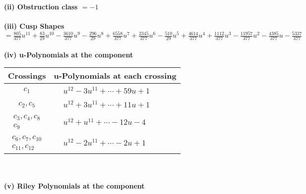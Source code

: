 \documentclass[1p]{elsarticle_modified}
\theoremstyle{definition}
\begin{document}
\flushleft \textbf{(ii) Obstruction class $= -1$}\\~\\
\flushleft \textbf{(iii) Cusp Shapes $= \frac{805}{377} u^{11}+\frac{83}{29} u^{10}-\frac{3610}{377} u^9-\frac{296}{29} u^8+\frac{6558}{377} u^7+\frac{2345}{377} u^6-\frac{510}{29} u^5+\frac{4614}{377} u^4+\frac{1112}{377} u^3-\frac{11957}{377} u^2-\frac{4385}{377} u-\frac{5337}{377}$}\\~\\
\newpage\renewcommand{\arraystretch}{1}
\flushleft \textbf{(iv) u-Polynomials at the component}\newline \\
\begin{tabular}{m{50pt}|m{274pt}}
Crossings & \hspace{64pt}u-Polynomials at each crossing \\
\hline $$\begin{aligned}c_{1}\end{aligned}$$&$\begin{aligned}
&u^{12}-3 u^{11}+\cdots+59 u+1
\end{aligned}$\\
\hline $$\begin{aligned}c_{2},c_{5}\end{aligned}$$&$\begin{aligned}
&u^{12}+3 u^{11}+\cdots+11 u+1
\end{aligned}$\\
\hline $$\begin{aligned}c_{3},c_{4},c_{8}\\c_{9}\end{aligned}$$&$\begin{aligned}
&u^{12}+u^{11}+\cdots-12 u-4
\end{aligned}$\\
\hline $$\begin{aligned}c_{6},c_{7},c_{10}\\c_{11},c_{12}\end{aligned}$$&$\begin{aligned}
&u^{12}-2 u^{11}+\cdots-2 u+1
\end{aligned}$\\
\hline
\end{tabular}\\~\\
\newpage\renewcommand{\arraystretch}{1}
\flushleft \textbf{(v) Riley Polynomials at the component}\newline \\
\end{document}
